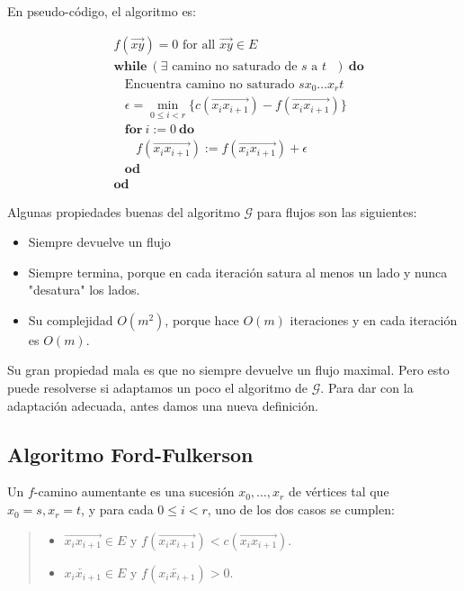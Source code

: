 \documentclass[a4paper]{article}
\begin{document}
En pseudo-código, el algoritmo es:


\begin{align*}
    &f(\overrightarrow{xy}) = 0 \text{ for all $\overrightarrow{xy} \in E$ } \\ 
    &\textbf{while} ~ (\exists \text{ camino no saturado de $s$ a $t$ })
    ~\textbf{do}\\
    & ~ ~ ~ ~ \text{Encuentra camino no saturado $sx_0 \ldots x_{r} t$}\\
    &~ ~ ~ ~ \epsilon = \min_{0 \leq i < r} \Big\{ c(\overrightarrow{x_i x_{i+1}}) -
    f(\overrightarrow{x_i x_{i+1}})\Big\}\\
    &~ ~ ~ ~ \textbf{for} ~ i := 0 ~ \textbf{do}\\ 
    &~ ~ ~ ~  ~ ~ ~ ~  f(\overrightarrow{x_i x_{i+1}}) := f(\overrightarrow{x_i x_{i+1}}) + \epsilon \\
    &~ ~ ~ ~ \textbf{od} \\ 
    &\textbf{od}
\end{align*}

Algunas propiedades buenas del algoritmo $\mathscr{G}$ para flujos son las siguientes:

\begin{itemize}
    \item Siempre devuelve un flujo 
    \item Siempre termina, porque en cada iteración satura al menos un lado y
        nunca "desatura" los lados.
    \item Su complejidad $O(m^2)$, porque hace $O(m)$ iteraciones y en cada
        iteración es $O(m)$.
\end{itemize}

Su gran propiedad mala es que no siempre devuelve un flujo maximal. Pero esto
puede resolverse si adaptamos un poco el algoritmo de $\mathscr{G}$. Para dar con la
adaptación adecuada, antes damos una nueva definición. 

\subsection{Algoritmo Ford-Fulkerson}

\begin{definition}
    Un $f$-camino aumentante es una sucesión $x_0, \ldots, x_r$ de vértices tal que
    $x_0 = s, x_r = t$, y para cada $0 \leq i < r$, uno de los dos casos se
    cumplen: 

    \begin{quote}
        
        \begin{itemize}
        \item $\overrightarrow{x_i x_{i+1}} \in E$ y
        $f(\overrightarrow{x_ix_{i+1}}) < c(\overrightarrow{x_ix_{i+1}})$.
    \item $\overleftarrow{x_{i}x_{i+1}} \in E$ y
            $f(\overleftarrow{x_{i}x_{i+1}}) > 0$.
        \end{itemize}
    \end{quote}


\end{definition}
    
\end{document}

